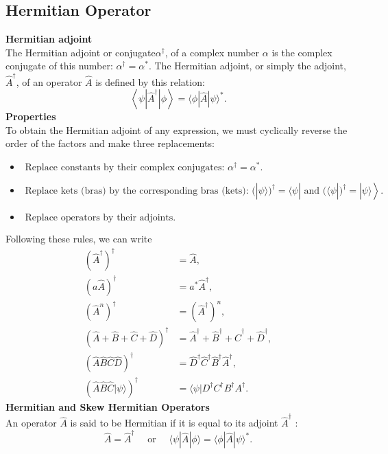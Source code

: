 \subsection{Hermitian Operator}
\textbf{Hermitian adjoint}\\
The Hermitian adjoint or conjugate$ \alpha^{\dagger}$, of a complex number $\alpha$ is the complex conjugate of this number: $\alpha^{\dagger}=\alpha^{*}$. The Hermitian adjoint, or simply the adjoint, $\hat{A}^{\dagger}$, of an operator $\hat{A}$ is defined by this relation:
$$
\left\langle\psi\left|\hat{A}^{\dagger}\right| \phi\right\rangle=\langle\phi|\hat{A}| \psi\rangle^{*} .
$$
\textbf{Properties}\\
To obtain the Hermitian adjoint of any expression, we must cyclically reverse the order of the factors and make three replacements:
\begin{itemize}
	\item $\text { Replace constants by their complex conjugates: } \alpha^{\dagger}=\alpha^{*} \text {. }$
	\item $\text { Replace kets (bras) by the corresponding bras (kets): } \left.(|\psi\rangle)^{\dagger}=\langle\psi| \text { and }(\langle\psi|)^{\dagger}=|\psi\rangle\right\rangle \text {. }$
	\item  $\text { Replace operators by their adjoints. }$
\end{itemize}
Following these rules, we can write
$$
\begin{aligned}
\left(\hat{A}^{\dagger}\right)^{\dagger} &=\hat{A}, \\
(a \hat{A})^{\dagger} &=a^{*} \hat{A}^{\dagger}, \\
\left(\hat{A}^{n}\right)^{\dagger} &=\left(\hat{A}^{\dagger}\right)^{n}, \\
(\hat{A}+\hat{B}+\hat{C}+\hat{D})^{\dagger} &=\hat{A}^{\dagger}+\hat{B}^{\dagger}+\hat{C}^{\dagger}+\hat{D}^{\dagger}, \\
(\hat{A} \hat{B} \hat{C} \hat{D})^{\dagger} &=\hat{D}^{\dagger} \hat{C}^{\dagger} \hat{B}^{\dagger} \hat{A}^{\dagger}, \\
(\hat{A} \hat{B} \hat{C}|\psi\rangle)^{\dagger} &=\langle\psi| D^{\dagger} C^{\dagger} B^{\dagger} A^{\dagger} .
\end{aligned}
$$
\textbf{Hermitian and Skew Hermitian Operators}\\
An operator $\hat{A}$ is said to be Hermitian if it is equal to its adjoint $\hat{A}^{\dagger}$ :
$$
\hat{A}=\hat{A}^{\dagger} \quad \text { or } \quad\langle\psi|\hat{A}| \phi\rangle=\langle\phi|\hat{A}| \psi\rangle^{*} .
$$
